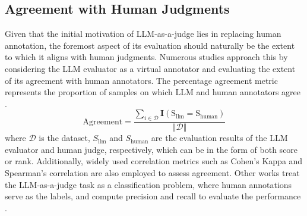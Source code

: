 \documentclass[acmsmall,screen]{acmart}
\newcommand{\del}[1]{\textcolor{red}{$\times$ #1}}
\begin{document}

\subsection{Agreement with Human Judgments}
\label{Evaluation:base metric}
Given that the initial motivation of LLM-as-a-judge lies in replacing human annotation, the foremost aspect of its evaluation should naturally be the extent to which it aligns with human judgments.
Numerous studies approach this by considering the LLM evaluator as a virtual annotator and evaluating the extent of its agreement with human annotators.
The percentage agreement metric represents the proportion of samples on which LLM and human annotators agree \cite{thakur2024judging}. 
$$\text{Agreement} = \frac{\sum_{i\in \mathcal{D}} \mathbf{I}(\text{S}_{\text{llm}} = \text{S}_{\text{human}})}{ \Vert \mathcal{D} \Vert}$$
where $\mathcal{D}$ is the dataset, $S_{\text{llm}}$ and $S_{\text{human}} $ are the evaluation results of the LLM evaluator and human judge, respectively, which can be in the form of both score or rank.
Additionally, widely used correlation metrics such as Cohen's Kappa \cite{thakur2024judging} and Spearman's correlation \cite{liu2024aligning, lm-as-an-examiner} are also employed to assess agreement.
Other works treat the LLM-as-a-judge task as a classification problem, where human annotations serve as the labels, and compute precision and recall to evaluate the performance \cite{zhu2023judgelm, wang2023pandalm}.
\end{document}
